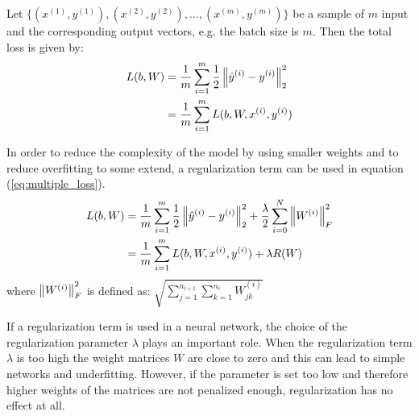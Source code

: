 \begin{definition}\label{def:batch_loss}
	Let $\{(x^{(1)}, y^{(1)}), (x^{(2)}, y^{(2)}), ..., (x^{(m)}, y^{(m)})\}$ be a sample of $m$ input and the corresponding output vectors, e.g. the batch size is $m$. Then the total loss is given by:	
	\begin{equation}\label{eq:multiple_loss}
	\begin{aligned}
	L(b, W) &= \frac{1}{m} \sum_{i=1}^m \frac{1}{2} \left\lVert\hat{y}^{(i)} - y^{(i)}\right\rVert^2_2 \\
			&= \frac{1}{m} \sum_{i=1}^m L(b, W, x^{(i)}, y^{(i)})
	\end{aligned}
	\end{equation}
\end{definition}

\begin{remark} \label{rem:regularization}
	In order to reduce the complexity of the model by using smaller weights and to reduce overfitting to some extend, a regularization term can be used in equation (\ref{eq:multiple_loss}).
	\begin{equation}\label{eq:multiple_loss_regularization}
	\begin{aligned}
	L(b, W) &= \frac{1}{m} \sum_{i=1}^m \frac{1}{2} \left\lVert\hat{y}^{(i)} - y^{(i)}\right\rVert^2_2 + \frac{\lambda}{2} \sum_{i=0}^{N} \left\lVert W^{(i)}\right\rVert_F^2\\
	&= \frac{1}{m} \sum_{i=1}^m L(b, W, x^{(i)}, y^{(i)}) + \lambda R(W)
	\end{aligned}
	\end{equation}
	where $\left\lVert W^{(i)}\right\rVert_F^2$ is defined as: $\sqrt{\sum_{j=1}^{n_{i+1}}\sum_{k=1}^{n_i} W^{(i)}_{jk}}$ 
\end{remark}

If a regularization term is used in a neural network, the choice of the regularization parameter $\lambda$ plays an important role. When the regularization term $\lambda$ is too high the weight matrices $W$ are close to zero and this can lead to simple networks and underfitting. However, if the parameter is set too low and therefore higher weights of the matrices are not penalized enough, regularization has no effect at all.


